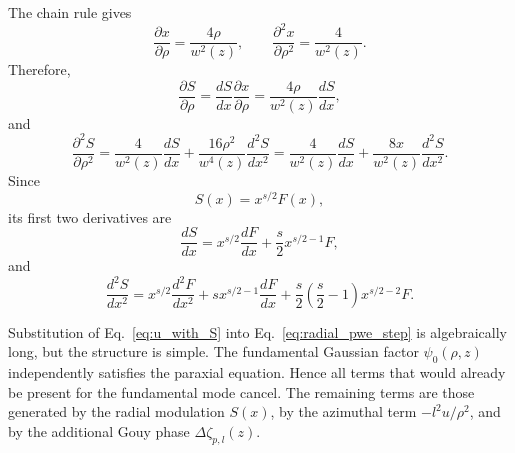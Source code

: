 \begin{resolucao}[Solution]
    The chain rule gives
    \begin{equation}
        \frac{\partial x}{\partial \rho}
        =
        \frac{4\rho}{w^2(z)},
        \qquad
        \frac{\partial^2 x}{\partial \rho^2}
        =
        \frac{4}{w^2(z)}.
        \label{eq:x_rho_derivatives}
    \end{equation}
    Therefore,
    \begin{equation}
        \frac{\partial S}{\partial \rho}
        =
        \frac{dS}{dx}
        \frac{\partial x}{\partial \rho}
        =
        \frac{4\rho}{w^2(z)}
        \frac{dS}{dx},
        \label{eq:first_chain_S}
    \end{equation}
    and
    \begin{equation}
        \frac{\partial^2 S}{\partial \rho^2}
        =
        \frac{4}{w^2(z)}
        \frac{dS}{dx}
        +
        \frac{16\rho^2}{w^4(z)}
        \frac{d^2S}{dx^2}
        =
        \frac{4}{w^2(z)}
        \frac{dS}{dx}
        +
        \frac{8x}{w^2(z)}
        \frac{d^2S}{dx^2}.
        \label{eq:second_chain_S}
    \end{equation}
    Since
    \begin{equation}
        S(x)=x^{s/2}F(x),
    \end{equation}
    its first two derivatives are
    \begin{equation}
        \frac{dS}{dx}
        =
        x^{s/2}\frac{dF}{dx}
        +
        \frac{s}{2}
        x^{s/2-1}F,
        \label{eq:S_first_derivative}
    \end{equation}
    and
    \begin{equation}
        \frac{d^2S}{dx^2}
        =
        x^{s/2}\frac{d^2F}{dx^2}
        +
        s x^{s/2-1}\frac{dF}{dx}
        +
        \frac{s}{2}
        \left(
            \frac{s}{2}-1
        \right)
        x^{s/2-2}F.
        \label{eq:S_second_derivative}
    \end{equation}

    Substitution of Eq.~\eqref{eq:u_with_S} into Eq.~\eqref{eq:radial_pwe_step} is algebraically long, but the structure is simple. The fundamental Gaussian factor $\psi_0(\rho,z)$ independently satisfies the paraxial equation. Hence all terms that would already be present for the fundamental mode cancel. The remaining terms are those generated by the radial modulation $S(x)$, by the azimuthal term $-l^2u/\rho^2$, and by the additional Gouy phase $\Delta\zeta_{p,l}(z)$.


\end{resolucao}
